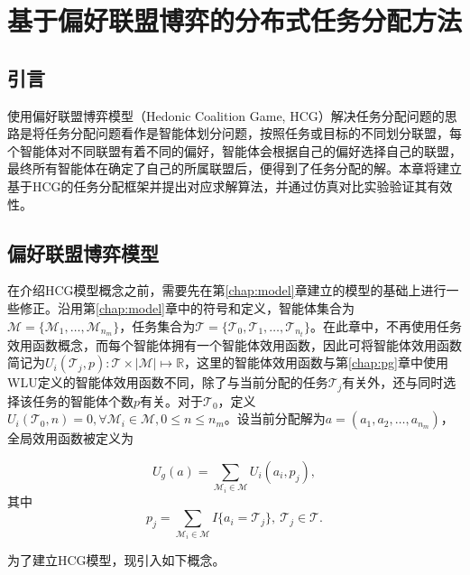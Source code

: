 
\chapter{基于偏好联盟博弈的分布式任务分配方法}
\label{chap:hedonic}

\section{引言}
\label{hg:sec:intro}

使用偏好联盟博弈模型（Hedonic Coalition Game, HCG）解决任务分配问题的思路是将任务分配问题看作是智能体划分问题，按照任务或目标的不同划分联盟，每个智能体对不同联盟有着不同的偏好，智能体会根据自己的偏好选择自己的联盟，最终所有智能体在确定了自己的所属联盟后，便得到了任务分配的解。本章将建立基于HCG的任务分配框架并提出对应求解算法，并通过仿真对比实验验证其有效性。


\section{偏好联盟博弈模型}
\label{hcg:sec:hcgmodel}

在介绍HCG模型概念之前，需要先在第\ref{chap:model}章建立的模型的基础上进行一些修正。沿用第\ref{chap:model}章中的符号和定义，智能体集合为$\mathcal{M}=\{\mathcal{M}_1,\dots,\mathcal{M}_{n_m}\}$，任务集合为$\mathcal{T} = \{\mathcal{T}_0,\mathcal{T}_1,\dots,\mathcal{T}_{n_t}\}$。在此章中，不再使用任务效用函数概念，而每个智能体拥有一个智能体效用函数，因此可将智能体效用函数简记为$U_i(\mathcal{T}_j,p):\mathcal{T} \times |\mathcal{M}| \mapsto \mathbb{R}$，这里的智能体效用函数与第\ref{chap:pg}章中使用WLU定义的智能体效用函数不同，除了与当前分配的任务$\mathcal{T}_j$有关外，还与同时选择该任务的智能体个数$p$有关。对于$\mathcal{T}_0$，定义$U_i(\mathcal{T}_0,n)=0,\forall \mathcal{M}_i \in \mathcal{M}, 0 \leq n \leq n_m$。设当前分配解为$a=(a_1,a_2,\dots,a_{n_m})$，全局效用函数被定义为

\begin{equation}
\label{hcg:eq:gloablU}
	U_g(a) = \sum_{\mathcal{M}_i \in \mathcal{M}} U_i(a_i,p_j),
\end{equation}
其中
\begin{equation}
\label{hcg:eq:parcitipants}
	p_j = \sum_{\mathcal{M}_i \in \mathcal{M}} I\{a_i = \mathcal{T}_j\},\ \mathcal{T}_j \in \mathcal{T}.
\end{equation}

为了建立HCG模型，现引入如下概念。

